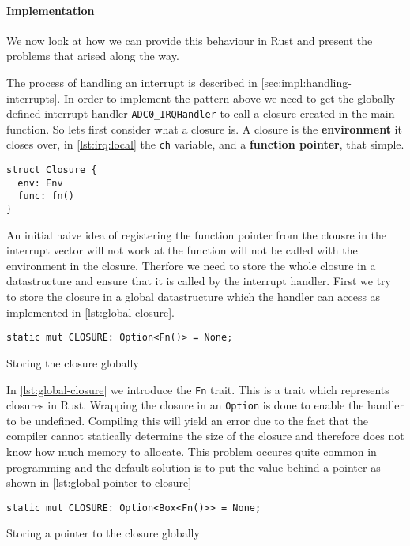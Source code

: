 \paragraph{Implementation}
We now look at how we can provide this behaviour in Rust and present the problems that arised along the way.

The process of handling an interrupt is described in \autoref{sec:impl:handling-interrupts}.
In order to implement the pattern above we need to get the globally defined interrupt handler \texttt{ADC0\_IRQHandler} to call a closure created in the main function.
So lets first consider what a closure is.
A closure is the \textbf{environment} it closes over, in \autoref{lst:irq:local} the \texttt{ch} variable, and a \textbf{function pointer}, that simple.
\begin{listing}[H]
  \begin{verbatim}
struct Closure {
  env: Env
  func: fn()
}
  \end{verbatim}
  \caption{}
  \label{lst:}
\end{listing}
An initial naive idea of registering the function pointer from the clousre in the interrupt vector will not work at the function will not be called with the environment in the closure.
Therfore we need to store the whole closure in a datastructure and ensure that it is called by the interrupt handler.
First we try to store the closure in a global datastructure which the handler can access as implemented in \autoref{lst:global-closure}.

\begin{listing}[H]
  \begin{verbatim}
static mut CLOSURE: Option<Fn()> = None;
  \end{verbatim}
  \caption{Storing the closure globally}
  \label{lst:global-closure}
\end{listing}

In \autoref{lst:global-closure} we introduce the \texttt{Fn} trait.
This is a trait which represents closures in Rust.
Wrapping the closure in an \texttt{Option} is done to enable the handler to be undefined.
Compiling this will yield an error due to the fact that the compiler cannot statically determine the size of the closure and therefore does not know how much memory to allocate.
This problem occures quite common in programming and the default solution is to put the value behind a pointer as shown in \autoref{lst:global-pointer-to-closure}

\begin{listing}[H]
  \begin{verbatim}
static mut CLOSURE: Option<Box<Fn()>> = None;
  \end{verbatim}
  \caption{Storing a pointer to the closure globally}
  \label{lst:global-pointer-to-closure}
\end{listing}


